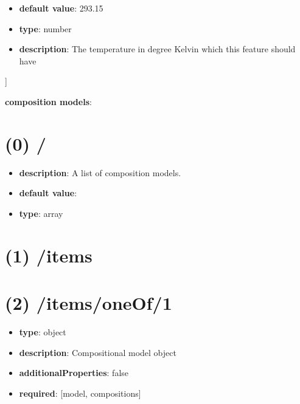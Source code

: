 \begin{itemize}[leftmargin=1em]\item {\bf default value}: 293.15
\item {\bf type}: number
\item {\bf description}: The temperature in degree Kelvin which this feature should have
\end{itemize}]\item {\bf composition models}: \section{(0) /}
\begin{itemize}[leftmargin=0em]\item {\bf description}: A list of composition models.
\item {\bf default value}: 
\item {\bf type}: array
\end{itemize}\section{(1) /items}

\section{(2) /items/oneOf/1}
\begin{itemize}[leftmargin=2em]\item {\bf type}: object
\item {\bf description}: Compositional model object
\item {\bf additionalProperties}: false
\item {\bf required}: [model, compositions]\end{itemize}
